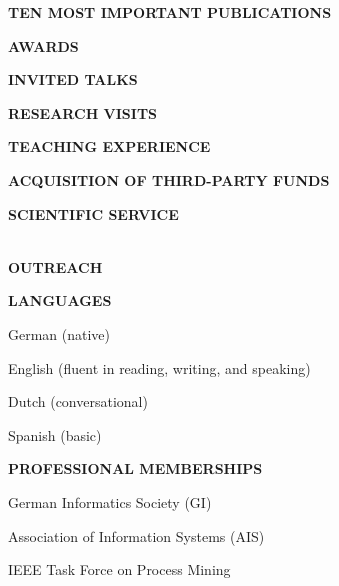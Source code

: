\documentclass[titlepage]{article}
\newenvironment{itemize*}%
  {\begin{itemize}%
    \setlength{\itemsep}{0pt}%
    \setlength{\parskip}{0pt}}%
  {\end{itemize}}
\newcommand{\heading}[1] {
\vspace*{0.7cm}\noindent \textcolor{myred}{\large{\textbf{\uppercase{{#1}}}}} \\[-5pt]
\noindent\makebox[\linewidth]{\rule{\textwidth}{0.4pt}\vspace*{0.2cm}}
}
\newcommand{\subheading}[1] {\vspace*{0.5cm}\noindent \uppercase{\textbf{#1}}}
\begin{document}
\heading{Ten Most Important Publications}


\pagebreak
\heading{Awards}



\heading{Invited Talks}



\heading{Research Visits}


\heading{Teaching Experience}



%

\heading{Acquisition of Third-Party Funds}



\pagebreak
\heading{Scientific Service} \\


\pagebreak
\heading{Outreach}


\heading{Languages}
\begin{itemize*}
\item  German (native)
\item English (fluent in reading, writing, and speaking)
\item Dutch (conversational)
\item Spanish (basic)
\end{itemize*}

\heading{Professional Memberships}
\begin{itemize*}
\item German Informatics Society (GI)
\item Association of Information Systems (AIS)
\item IEEE Task Force on Process Mining
\end{itemize*}
\end{document}
